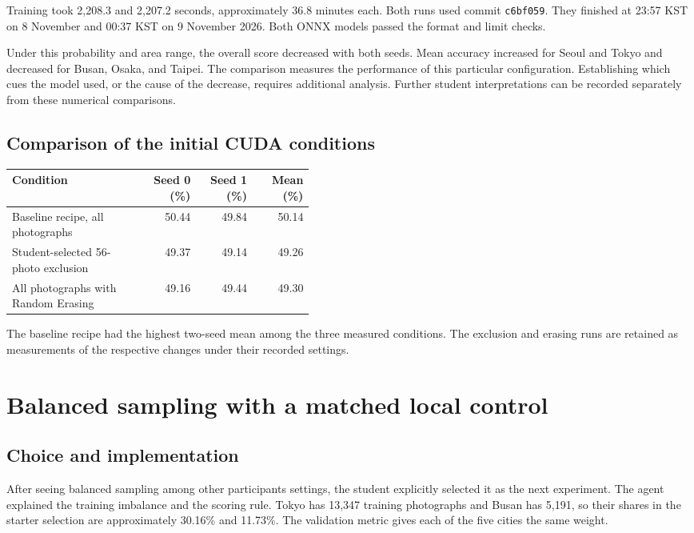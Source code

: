 \documentclass[11pt]{article}
\begin{document}
Training took 2,208.3 and 2,207.2 seconds, approximately 36.8 minutes each.
Both runs used commit \texttt{c6bf059}. They finished at 23:57 KST on
8 November and 00:37 KST on 9 November 2026. Both ONNX models passed the
format and limit checks.

Under this probability and area range, the overall score decreased with both
seeds. Mean accuracy increased for Seoul and Tokyo and decreased for Busan,
Osaka, and Taipei. The comparison measures the performance of this particular
configuration. Establishing which cues the model used, or the cause of the
decrease, requires additional analysis. Further student interpretations can
be recorded separately from these numerical comparisons.

\subsection{Comparison of the initial CUDA conditions}

\begin{center}\small
\begin{tabular}{p{0.44\linewidth}rrr}
\toprule
Condition & Seed 0 (\%) & Seed 1 (\%) & Mean (\%) \\
\midrule
Baseline recipe, all photographs & 50.44 & 49.84 & 50.14 \\
Student-selected 56-photo exclusion & 49.37 & 49.14 & 49.26 \\
All photographs with Random Erasing & 49.16 & 49.44 & 49.30 \\
\bottomrule
\end{tabular}
\end{center}

The baseline recipe had the highest two-seed mean among the three measured
conditions. The exclusion and erasing runs are retained as measurements of
the respective changes under their recorded settings.

\section{Balanced sampling with a matched local control}
\label{sec:balanced}

\subsection{Choice and implementation}

After seeing balanced sampling among other participants\textquotesingle{}
settings, the student explicitly selected it as the next experiment.
The agent explained the training imbalance and the scoring rule. Tokyo has
13,347 training photographs and Busan has 5,191, so their shares in the
starter selection are approximately 30.16\% and 11.73\%. The validation
metric gives each of the five cities the same weight.
\end{document}
